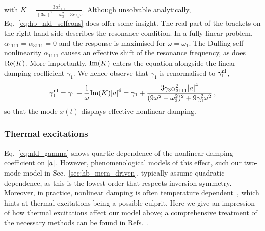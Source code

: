 with $K = \frac{3 \alpha_{3111}^2}{(3\omega)^2 - \omega_3^2 - 3 i \gamma_3 \omega}$.
Although unsolvable analytically, Eq.~\eqref{eq:hb_nld_selfcons} does offer some insight. The real part of the brackets on the right-hand side describes the resonance condition. In a fully linear problem, $\alpha_{1111} = \alpha_{3111} = 0$ and the response is maximised for $\omega = \omega_1$. The Duffing self-nonlinearity $\alpha_{1111}$ causes an effective shift of the resonance frequency, as does $\text{Re} (K)$. More importantly, $\text{Im} (K)$ enters the equation alongside the linear damping coefficient $\gamma_1$. We hence observe that $\gamma_1$ is renormalised to $\gamma_1^{\rm nl}$,
\begin{equation} \label{eq:nld_gamma}
\gamma_1^{\rm nl} = \gamma_1 + \frac{1}{\omega} \text{Im} (K) \abs{a}^4 = \gamma_1 + \frac{3 \gamma_3 \alpha_{3111}^2 \abs{a}^4}{( 9\omega^2 - \omega_3^2)^2 + 9 \gamma_3^2 \omega^2} \,,
\end{equation}
so that the mode $x(t)$ displays effective nonlinear damping. 

\subsubsection{Thermal excitations}

Eq.~\eqref{eq:nld_gamma} shows quartic dependence of the nonlinear damping coefficient on $\abs{a}$. However, phenomenological models of this effect, such our two-mode model in Sec.~\ref{sec:hb_mem_driven}, typically assume quadratic dependence, as this is the lowest order that respects inversion symmetry. Moreover, in practice, nonlinear damping is often temperature dependent~\cite{Catalini_2021}, which hints at thermal excitations being a possible culprit. Here we give an impression of how thermal excitations affect our model above; a comprehensive treatment of the necessary methods can be found in Refs.~\cite{Gardiner, Roberts_1986, Khasminskii_1966, Toni_thesis}.

